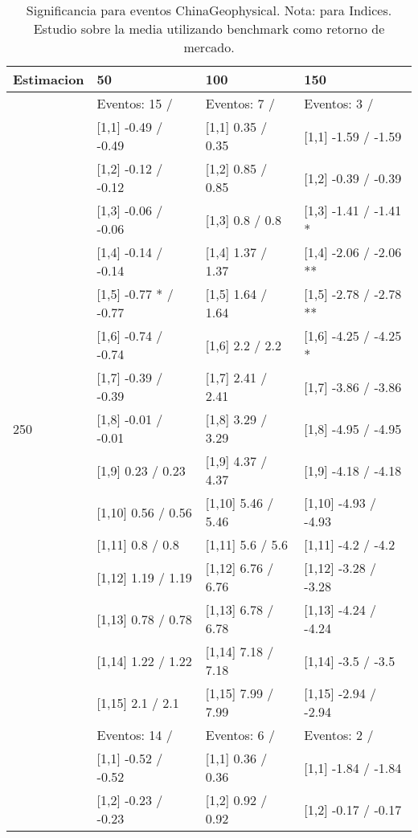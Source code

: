 \begin{table}

\caption{Significancia para eventos ChinaGeophysical. Nota: para Indices. Estudio sobre la media utilizando benchmark como retorno de mercado.}
\centering
\begin{tabular}[t]{llll}
\toprule
Estimacion & 50 & 100 & 150\\
\midrule
 & Eventos:  15 / & Eventos:  7 / & Eventos:  3 /\\
 & {}[1,1] -0.49  / -0.49 & {}[1,1] 0.35  / 0.35 & {}[1,1] -1.59  / -1.59\\
 & {}[1,2] -0.12  / -0.12 & {}[1,2] 0.85  / 0.85 & {}[1,2] -0.39  / -0.39\\
 & {}[1,3] -0.06  / -0.06 & {}[1,3] 0.8  / 0.8 & {}[1,3] -1.41  / -1.41 *\\
 & {}[1,4] -0.14  / -0.14 & {}[1,4] 1.37  / 1.37 & {}[1,4] -2.06  / -2.06 **\\
\addlinespace
 & {}[1,5] -0.77 * / -0.77 & {}[1,5] 1.64  / 1.64 & {}[1,5] -2.78  / -2.78 **\\
 & {}[1,6] -0.74  / -0.74 & {}[1,6] 2.2  / 2.2 & {}[1,6] -4.25  / -4.25 *\\
 & {}[1,7] -0.39  / -0.39 & {}[1,7] 2.41  / 2.41 & {}[1,7] -3.86  / -3.86\\
250 & {}[1,8] -0.01  / -0.01 & {}[1,8] 3.29  / 3.29 & {}[1,8] -4.95  / -4.95\\
 & {}[1,9] 0.23  / 0.23 & {}[1,9] 4.37  / 4.37 & {}[1,9] -4.18  / -4.18\\
\addlinespace
 & {}[1,10] 0.56  / 0.56 & {}[1,10] 5.46  / 5.46 & {}[1,10] -4.93  / -4.93\\
 & {}[1,11] 0.8  / 0.8 & {}[1,11] 5.6  / 5.6 & {}[1,11] -4.2  / -4.2\\
 & {}[1,12] 1.19  / 1.19 & {}[1,12] 6.76  / 6.76 & {}[1,12] -3.28  / -3.28\\
 & {}[1,13] 0.78  / 0.78 & {}[1,13] 6.78  / 6.78 & {}[1,13] -4.24  / -4.24\\
 & {}[1,14] 1.22  / 1.22 & {}[1,14] 7.18  / 7.18 & {}[1,14] -3.5  / -3.5\\
\addlinespace
 & {}[1,15] 2.1  / 2.1 & {}[1,15] 7.99  / 7.99 & {}[1,15] -2.94  / -2.94\\
 & Eventos:  14 / & Eventos:  6 / & Eventos:  2 /\\
 & {}[1,1] -0.52  / -0.52 & {}[1,1] 0.36  / 0.36 & {}[1,1] -1.84  / -1.84\\
 & {}[1,2] -0.23  / -0.23 & {}[1,2] 0.92  / 0.92 & {}[1,2] -0.17  / -0.17\\

\end{tabular}
\end{table}
